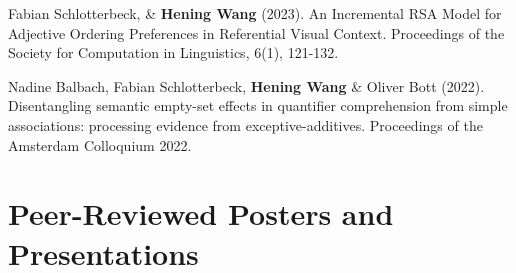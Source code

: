 \documentclass[letterpaper,11pt]{article}
\begin{document}
\begin{description}
\item {Fabian Schlotterbeck, \& \textbf{Hening Wang} (2023). An Incremental RSA Model for Adjective Ordering Preferences in Referential Visual Context. Proceedings of the Society for Computation in Linguistics, 6(1), 121-132.}

\item {Nadine Balbach, Fabian Schlotterbeck, \textbf{Hening Wang} \& Oliver Bott (2022). Disentangling semantic empty-set effects in quantifier comprehension from simple associations: processing evidence from exceptive-additives. Proceedings of the Amsterdam Colloquium 2022.}



\end{description}

\section{Peer-Reviewed Posters and Presentations}
\end{document}
